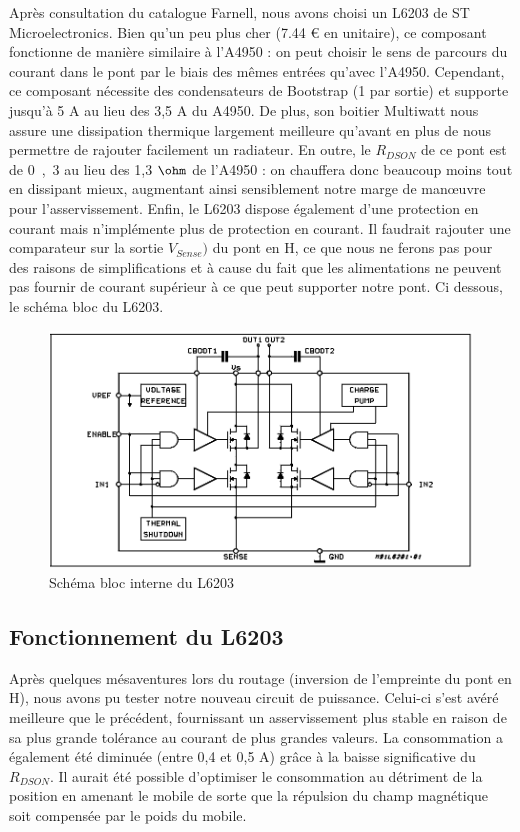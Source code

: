 \documentclass[11pt, french]{article} %
\begin{document}
Après consultation du catalogue Farnell, nous avons choisi un L6203 de ST Microelectronics. Bien qu'un peu plus cher (7.44 \euro{} en unitaire), ce composant fonctionne de manière similaire à l'A4950 : on peut choisir le sens de parcours du courant dans le pont par le biais des mêmes entrées qu'avec l'A4950. Cependant, ce composant nécessite des condensateurs de Bootstrap (1 par sortie) et supporte jusqu'à 5 A au lieu des 3,5 A du A4950. De plus, son boitier Multiwatt nous assure une dissipation thermique largement meilleure qu'avant en plus de nous permettre de rajouter facilement un radiateur. En outre, le $R_{DSON}$ de ce pont est de \unit{0,3}{\ohm} au lieu des 1,3 $\ohm$ de l'A4950 : on chauffera donc beaucoup moins tout en dissipant mieux, augmentant ainsi sensiblement notre marge de manœuvre pour l'asservissement. Enfin, le L6203 dispose également d'une protection en courant mais n'implémente plus de protection en courant. Il faudrait rajouter une comparateur sur la sortie $V_{Sense})$ du pont en H, ce que nous ne ferons pas pour des raisons de simplifications et à cause du fait que les alimentations ne peuvent pas fournir de courant supérieur à ce que peut supporter notre pont. 
Ci dessous, le schéma bloc du L6203. 

\begin{figure}[h!]
	\centering
	\includegraphics[width = 12cm]{SolutionNumerique/fonc_sch.png} 
	\caption{Schéma bloc interne du L6203}
\end{figure}

\subsection{Fonctionnement du L6203}

Après quelques mésaventures lors du routage (inversion de l'empreinte du pont en H), nous avons pu tester notre nouveau circuit de puissance. Celui-ci s'est avéré meilleure que le précédent, fournissant un asservissement plus stable en raison de sa plus grande tolérance au courant de plus grandes valeurs. La consommation a également été diminuée (entre 0,4 et 0,5 A) grâce à la baisse significative du $R_{DSON}$. Il aurait été possible d'optimiser le consommation au détriment de la position en amenant le mobile de sorte que la répulsion du champ magnétique soit compensée par le poids du mobile. 
\end{document}
